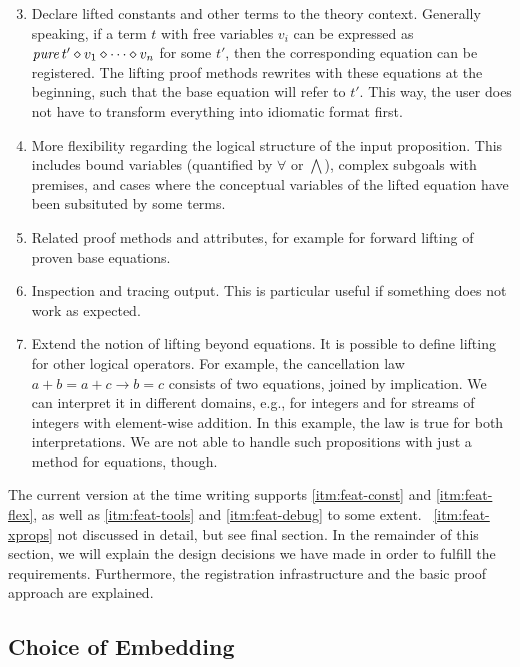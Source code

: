 \begin{enumerate}
\setcounter{enumi}{2}
\item\label{itm:feat-const}
	Declare lifted constants and other terms to the theory context.
	Generally speaking, if a term $t$ with free variables $v_i$ can be expressed
	as $\operatorname{\mathit{pure}} t' \diamond v_1 \diamond \cdots \diamond v_n$ for some $t'$, then the
	corresponding equation can be registered.
	The lifting proof methods rewrites with these equations at the beginning,
	such that the base equation will refer to $t'$.
	This way, the user does not have to transform everything into idiomatic
	format first.
\item\label{itm:feat-flex}
	More flexibility regarding the logical structure of the input proposition.
	This includes bound variables (quantified by $\forall$ or $\bigwedge$),
	complex subgoals with premises, and cases where the conceptual variables
	of the lifted equation have been subsituted by some terms.
\item\label{itm:feat-tools}
	Related proof methods and attributes, for example for forward lifting
	of proven base equations.
\item\label{itm:feat-debug}
	Inspection and tracing output.
	This is particular useful if something does not work as expected.
\item\label{itm:feat-xprops}
	Extend the notion of lifting beyond equations.
	It is possible to define lifting for other logical operators.
	For example, the cancellation law $a + b = a + c \longrightarrow b = c$
	consists of two equations, joined by implication.
	We can interpret it in different domains, e.g., for integers and for
	streams of integers with element-wise addition.
	In this example, the law is true for both interpretations.
	We are not able to handle such propositions with just a method for
	equations, though.
\end{enumerate}

The current version at the time writing supports \ref{itm:feat-const} and
\ref{itm:feat-flex}, as well as \ref{itm:feat-tools} and \ref{itm:feat-debug}
to some extent.
\todo\ \ref{itm:feat-xprops} not discussed in detail, but see final section. %
In the remainder of this section, we will explain the design decisions we
have made in order to fulfill the requirements.
Furthermore, the registration infrastructure and the basic proof approach are
explained.


\subsection{Choice of Embedding}\label{subsec:embedding}

